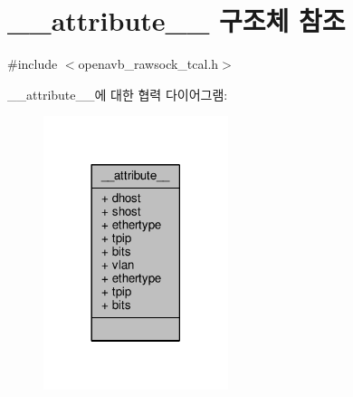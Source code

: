 \hypertarget{struct____attribute____}{}\section{\+\_\+\+\_\+attribute\+\_\+\+\_\+ 구조체 참조}
\label{struct____attribute____}


{\ttfamily \#include $<$openavb\+\_\+rawsock\+\_\+tcal.\+h$>$}



\+\_\+\+\_\+attribute\+\_\+\+\_\+에 대한 협력 다이어그램\+:
\nopagebreak
\begin{figure}[H]
\begin{center}
\leavevmode
\includegraphics[width=153pt]{struct____attribute______coll__graph}
\end{center}
\end{figure}
